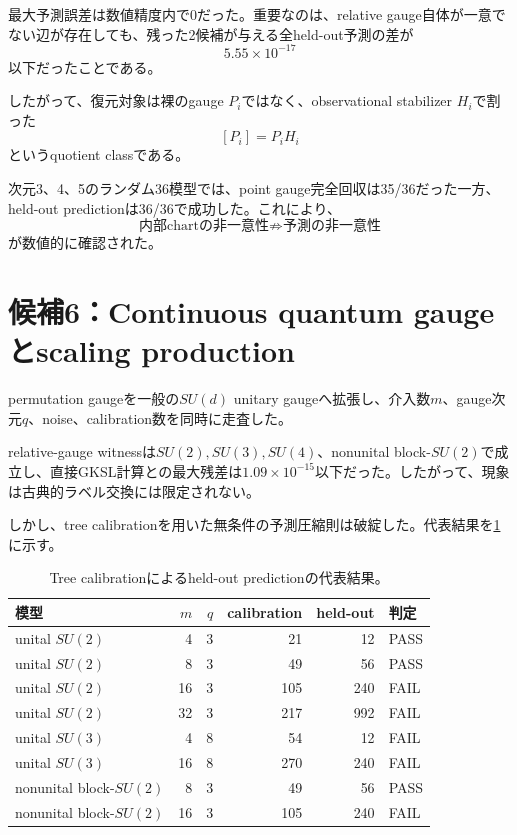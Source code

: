 \documentclass[11pt,a4paper,uplatex,dvipdfmx]{bxjsarticle}
\theoremstyle{remark}
\begin{document}
最大予測誤差は数値精度内で0だった。重要なのは、relative gauge自体が一意でない辺が存在しても、残った2候補が与える全held-out予測の差が
\begin{equation}
5.55\times10^{-17}
\end{equation}
以下だったことである。

したがって、復元対象は裸のgauge $P_i$ではなく、observational stabilizer $H_i$で割った
\begin{equation}
\boxed{[P_i]=P_iH_i}
\end{equation}
というquotient classである。

次元3、4、5のランダム36模型では、point gauge完全回収は35/36だった一方、held-out predictionは36/36で成功した。これにより、
\begin{equation}
\text{内部chartの非一意性}
\not\Rightarrow
\text{予測の非一意性}
\end{equation}
が数値的に確認された。

\section{候補6：Continuous quantum gaugeとscaling production}

permutation gaugeを一般の$SU(d)$ unitary gaugeへ拡張し、介入数$m$、gauge次元$q$、noise、calibration数を同時に走査した。

relative-gauge witnessは$SU(2),SU(3),SU(4)$、nonunital block-$SU(2)$で成立し、直接GKSL計算との最大残差は$1.09\times10^{-15}$以下だった。したがって、現象は古典的ラベル交換には限定されない。

しかし、tree calibrationを用いた無条件の予測圧縮則は破綻した。代表結果を\cref{tab:tree-scaling}に示す。

\begin{table}[htbp]
\centering
\caption{Tree calibrationによるheld-out predictionの代表結果。}
\label{tab:tree-scaling}
\begin{tabular}{lrrrrl}
\toprule
模型 & $m$ & $q$ & calibration & held-out & 判定 \\
\midrule
unital $SU(2)$ & 4 & 3 & 21 & 12 & PASS \\
unital $SU(2)$ & 8 & 3 & 49 & 56 & PASS \\
unital $SU(2)$ & 16 & 3 & 105 & 240 & FAIL \\
unital $SU(2)$ & 32 & 3 & 217 & 992 & FAIL \\
unital $SU(3)$ & 4 & 8 & 54 & 12 & FAIL \\
unital $SU(3)$ & 16 & 8 & 270 & 240 & FAIL \\
nonunital block-$SU(2)$ & 8 & 3 & 49 & 56 & PASS \\
nonunital block-$SU(2)$ & 16 & 3 & 105 & 240 & FAIL \\
\bottomrule
\end{tabular}
\end{table}
\end{document}
